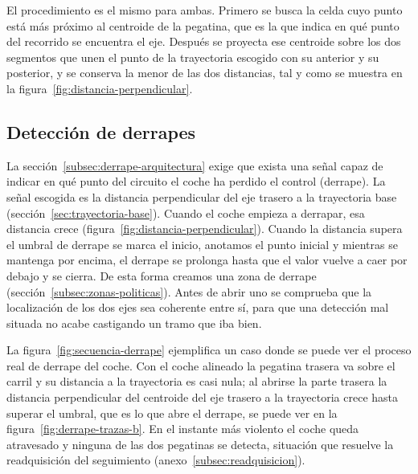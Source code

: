 El procedimiento es el mismo para ambas. Primero se busca la celda cuyo punto está más próximo al centroide de la pegatina, que es la que indica en qué punto del recorrido se encuentra el eje. Después se proyecta ese centroide sobre los dos segmentos que unen el punto de la trayectoria escogido con su anterior y su posterior, y se conserva la menor de las dos distancias, tal y como se muestra en la figura~\ref{fig:distancia-perpendicular}.

\subsection{Detección de derrapes}
\label{subsec:algoritmo-derrapes}

La sección~\ref{subsec:derrape-arquitectura} exige que exista una señal capaz de indicar en qué punto del circuito el coche ha perdido el control (derrape). La señal escogida es la distancia perpendicular del eje trasero a la trayectoria base (sección~\ref{sec:trayectoria-base}). Cuando el coche empieza a derrapar, esa distancia crece (figura~\ref{fig:distancia-perpendicular}).  
Cuando la distancia supera el umbral de derrape se marca el inicio, anotamos el punto inicial y mientras se mantenga por encima, el derrape se prolonga hasta que el valor vuelve a caer por debajo y se cierra. De esta forma creamos una zona de derrape (sección~\ref{subsec:zonas-politicas}). Antes de abrir uno se comprueba que la localización de los dos ejes sea coherente entre sí, para que una detección mal situada no acabe castigando un tramo que iba bien.

La figura~\ref{fig:secuencia-derrape} ejemplifica un caso donde se puede ver el proceso real de derrape del coche. Con el coche alineado la pegatina trasera va sobre el carril y su distancia a la trayectoria es casi nula; al abrirse la parte trasera la distancia perpendicular del centroide del eje trasero a la trayectoria crece hasta superar el umbral, que es lo que abre el derrape, se puede ver en la figura~\ref{fig:derrape-trazas-b}. En el instante más violento el coche queda atravesado y ninguna de las dos pegatinas se detecta, situación que resuelve la readquisición del seguimiento (anexo~\ref{subsec:readquisicion}).

